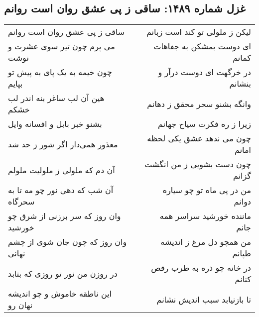 \begin{center}
\section*{غزل شماره ۱۴۸۹: ساقی ز پی عشق روان است روانم}
\label{sec:1489}
\begin{longtable}{l p{0.5cm} r}
ساقی ز پی عشق روان است روانم
&&
لیکن ز ملولی تو کند است زبانم
\\
می پرم چون تیر سوی عشرت و نوشت
&&
ای دوست بمشکن به جفاهات کمانم
\\
چون خیمه به یک پای به پیش تو بپایم
&&
در خرگهت ای دوست درآر و بنشانم
\\
هین آن لب ساغر بنه اندر لب خشکم
&&
وانگه بشنو سحر محقق ز دهانم
\\
بشنو خبر بابل و افسانه وایل
&&
زیرا ز ره فکرت سیاح جهانم
\\
معذور همی‌دار اگر شور ز حد شد
&&
چون می ندهد عشق یکی لحظه امانم
\\
آن دم که ملولی ز ملولیت ملولم
&&
چون دست بشویی ز من انگشت گزانم
\\
آن شب که دهی نور چو مه تا به سحرگاه
&&
من در پی ماه تو چو سیاره دوانم
\\
وان روز که سر برزنی از شرق چو خورشید
&&
ماننده خورشید سراسر همه جانم
\\
وان روز که چون جان شوی از چشم نهانی
&&
من همچو دل مرغ ز اندیشه طپانم
\\
در روزن من نور تو روزی که بتابد
&&
در خانه چو ذره به طرب رقص کنانم
\\
این ناطقه خاموش و چو اندیشه نهان رو
&&
تا بازنیابد سبب اندیش نشانم
\\
\end{longtable}
\end{center}
